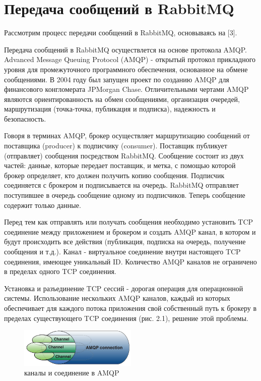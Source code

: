 \section{Передача сообщений в RabbitMQ} %
Рассмотрим процесс передачи сообщений в RabbitMQ, основываясь на [3].\par
Передача сообщений в RabbitMQ осуществлется на основе протокола AMQP. Advanced Message Queuing Protocol (AMQP) - открытый протокол прикладного уровня для промежуточного программного обеспечения, основанное на обмене сообщениями. В 2004 году был запущен проект по созданию AMQP для финансового конгломерата JPMorgan Chase. Отличительными чертами AMQP являются ориентированность на обмен сообщениями, организация очередей, маршрутизация (точка-точка, публикация и подписка), надежность и безопасность. \par
Говоря в терминах AMQP, брокер осуществляет маршрутизацию сообщений от поставщика (producer) к подписчику (consumer). Поставщик публикует (отправляет) сообщения посредством RabbitMQ. Сообщение состоит из двух частей: данные, которые передает поставщик, и метка, с помощью которой брокер определяет, кто должен получить копию сообщения. Подписчик соединяется с брокером и подписывается на очередь. RabbitMQ отправляет поступившее в очередь сообщение одному из подписчиков. Теперь сообщение содержит только данные.\par
Перед тем как отправлять или получать сообщения необходимо установить TCP соединение между приложением и брокером и создать AMQP канал, в котором и будут происходить все действия (публикация, подписка на очередь, получение сообщения и т.д.). Канал - виртуальное соединение внутри настоящего TCP соединения, имеющее уникальный ID. Количество AMQP каналов не ограничено в пределах одного TCP соединения.\par 
Установка и разъединение TCP сессий - дорогая операция для операционной системы. Использование нескольких AMQP каналов, каждый из которых обеспечивает  для каждого потока приложения свой собственный путь к брокеру в пределах существующего TCP соединения (рис. 2.1), решение этой проблемы.\par
\begin{figure}
\centering
\includegraphics[width=0.5\textwidth]{img/channels.png}
\caption{каналы и соединение в AMQP}
\end{figure}
